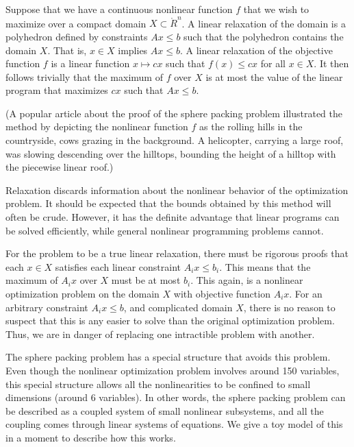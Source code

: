 Suppose that we have a continuous
nonlinear function $f$ that we wish to maximize
over a compact domain $X\subset \ring{R}^n$.    A linear relaxation
of the domain is a polyhedron defined by constraints $A x \le b$
such that the polyhedron contains the domain $X$.  That is,
$x\in X$ implies $A x \le b$.    A linear relaxation of the objective
function $f$ is a linear function $x\mapsto c x$ such that
$f(x) \le c x$ for all $x\in X$.  It then follows trivially
that the maximum of $f$ over $X$ is at most the value of 
the linear program that maximizes $c x$ such that $A x \le b$.

(A popular article about the proof of the sphere packing problem
illustrated the method by depicting the nonlinear function $f$
as the rolling hills in the countryside, cows grazing in the background.  
A helicopter,
carrying a large roof, was slowing
descending over the hilltops, bounding the height of a hilltop
with the piecewise linear roof.)

Relaxation discards information about the nonlinear behavior of the
optimization problem.  It should be expected that the bounds
obtained by this method will often be crude.  However, it has the
definite advantage that linear programs can be solved efficiently,
while general nonlinear programming problems cannot.

For the problem to be a true linear relaxation, there must be
rigorous proofs that each $x\in X$ satisfies each linear
constraint $A_i x\le b_i$.
This means that the maximum of $A_i x$ over $X$ must be at most $b_i$.
This again, is a nonlinear optimization problem on the domain $X$
with objective function $A_i x$.  For an arbitrary constraint $A_i x\le b$,
and complicated domain $X$, there is no reason to suspect that this
is any easier to solve than the original optimization problem.  Thus,
we are in danger of replacing one intractible problem with another.

The sphere packing problem has a special structure that avoids this
problem.  Even though the nonlinear optimization problem involves
around 150 variables, 
this special structure allows all the nonlinearities to 
be confined to small dimensions (around 6 variables).  In other words,
the sphere packing problem can be
described as a coupled system of small nonlinear subsystems,
and all the coupling comes through linear systems of equations. 
We give a toy model of this in a moment to describe how this works.

